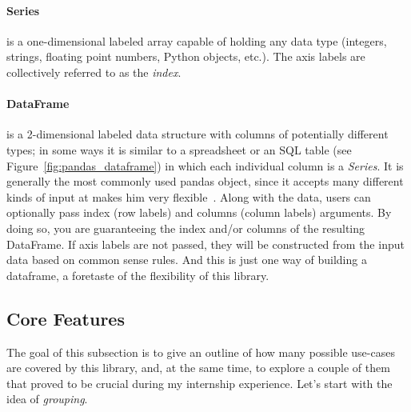 \paragraph{Series} is a one-dimensional labeled array capable of holding any data type (integers, strings, floating point numbers, Python objects, etc.). The axis labels are collectively referred to as the \textit{index}.

\paragraph{DataFrame} is a 2-dimensional labeled data structure with columns of potentially different types; in some ways it is
similar to
a spreadsheet or an SQL table (see Figure~\ref{fig:pandas_dataframe}) in which each individual column is a \textit{Series}.
It is generally the most commonly used pandas object, since it accepts many different kinds of input  at makes him very flexible~\cite{reback_pandas-dev/pandas:_2022}.
Along with the data,
users
%
can optionally pass index (row labels) and columns (column labels) arguments. By doing so,  you are guaranteeing the index and/or columns of the resulting DataFrame.
If axis labels are not passed, they will be constructed from the input data based on common sense rules.
And this is just one way of building a dataframe, a foretaste of the flexibility of this library.

\subsection{Core Features}
The
goal
%
of this subsection is to give an outline of how many possible use-cases are covered by this library, and, at the same time, to explore a couple of them that proved to be crucial during my internship experience.
Let's start with the idea of \textit{grouping}.

